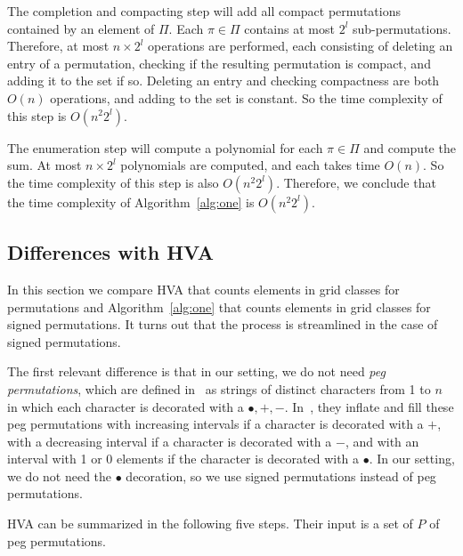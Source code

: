 \documentclass{article}
\numberwithin{equation}{section}
\theoremstyle{definition}
\begin{document}
The completion and compacting step will add all compact permutations contained by an element of $\Pi$. Each $\pi\in\Pi$ contains at most $2^l$ sub-permutations.  Therefore, at most $n\times2^l$ operations are performed, each consisting of deleting an entry of a permutation, checking if the resulting permutation is compact, and adding it to the set if so.  Deleting an entry and checking compactness are both $O(n)$ operations, and adding to the set is constant.  So the time complexity of this step is $O(n^2 2^l)$.

The enumeration step will compute a polynomial for each $\pi\in\Pi$ and compute the sum.  At most $n\times2^l$ polynomials are computed, and each takes time $O(n)$.  So the time complexity of this step is also $O(n^2 2^l)$. Therefore, we conclude that the time complexity of Algorithm~\ref{alg:one} is $O(n^2 2^l)$.


\subsection{Differences with HVA}

In this section we compare HVA that counts elements in grid classes for permutations and Algorithm~\ref{alg:one} that counts elements in grid classes for signed permutations. It turns out that the process is streamlined in the case of signed permutations. 


The first relevant difference is that in our setting, we do not need \emph{peg permutations}, which are defined in~\cite{HV16} as strings of distinct characters from 1 to $n$ in which each character is decorated with a $\bullet,+,-$. In~\cite{HV16}, they inflate and fill these peg permutations with increasing intervals if a character is decorated with a $+$, with a decreasing interval if a character is decorated with a $-$, and with an interval with 1 or 0 elements if the character is decorated with a $\bullet$. In our setting, we do not need the $\bullet$ decoration, so we use signed permutations instead of peg permutations. 

HVA can be summarized in the following five steps. Their input is a set of $P$ of peg permutations.
\end{document}
